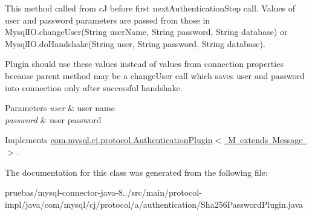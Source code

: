 This method called from cJ before first next\+Authentication\+Step call. Values of user and password parameters are passed from those in Mysql\+I\+O.\+change\+User(String user\+Name, String password, String database) or Mysql\+I\+O.\+do\+Handshake(String user, String password, String database).

Plugin should use these values instead of values from connection properties because parent method may be a change\+User call which saves user and password into connection only after successful handshake.


\begin{DoxyParams}{Parameters}
{\em user} & user name \\
\hline
{\em password} & user password \\
\hline
\end{DoxyParams}


Implements \mbox{\hyperlink{interfacecom_1_1mysql_1_1cj_1_1protocol_1_1_authentication_plugin_a22458c3992dbf9f91560d75a99e234d3}{com.\+mysql.\+cj.\+protocol.\+Authentication\+Plugin$<$ M extends Message $>$}}.



The documentation for this class was generated from the following file\+:\begin{DoxyCompactItemize}
\item 
pruebas/mysql-\/connector-\/java-\/8../src/main/protocol-\/impl/java/com/mysql/cj/protocol/a/authentication/Sha256\+Password\+Plugin.\+java\end{DoxyCompactItemize}
